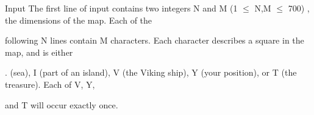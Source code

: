 Input
The first line of input contains two integers N and M (1 $\le$ N,M $\le$ 700) , the dimensions of the map. Each of the

following N lines contain M characters. Each character describes a square in the map, and is either

. (sea), I (part of an island), V (the Viking ship), Y (your position), or T (the treasure). Each of V, Y,

and T will occur exactly once.